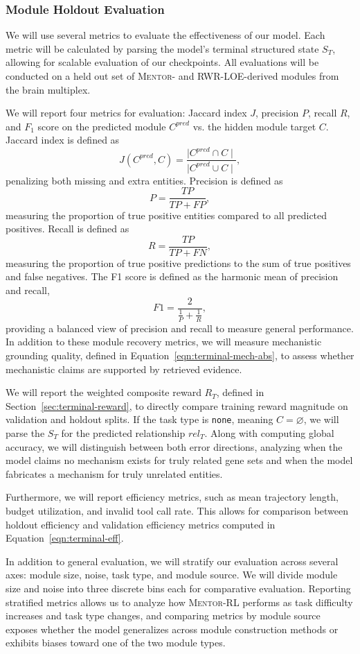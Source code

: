 \documentclass[thesis,letterpaper,12pt]{utthesis}
\begin{document}
\subsubsection{Module Holdout Evaluation}
We will use several metrics to evaluate the effectiveness of our model. Each metric will be calculated by parsing the model's terminal structured state $S_T$, allowing for scalable evaluation of our checkpoints. All evaluations will be conducted on a held out set of \textsc{Mentor}- and RWR-LOE-derived modules from the brain multiplex.

We will report four metrics for evaluation: Jaccard index $J$, precision $P$, recall $R$, and $F_1$ score on the predicted module $C^{pred}$ vs. the hidden module target $C$. Jaccard index is defined as 
\[
    J(C^{pred}, C) = \frac{\mid C^{pred} \cap C \mid}{\mid C^{pred} \cup C \mid},
\]
penalizing both missing and extra entities. Precision is defined as
\[
    P = \frac{TP}{TP + FP},
\]
measuring the proportion of true positive entities compared to all predicted positives. Recall is defined as
\[
    R = \frac{TP}{TP + FN},
\]
measuring the proportion of true positive predictions to the sum of true positives and false negatives. The F1 score is defined as the harmonic mean of precision and recall,
\[
    F1 = \frac{2}{\frac{1}{P} + \frac{1}{R}},
\]
providing a balanced view of precision and recall to measure general performance. In addition to these module recovery metrics, we will measure mechanistic grounding quality, defined in Equation~\ref{eqn:terminal-mech-abs}, to assess whether mechanistic claims are supported by retrieved evidence.  

We will report the weighted composite reward $R_T$, defined in Section~\ref{sec:terminal-reward}, to directly compare training reward magnitude on validation and holdout splits. If the task type is \texttt{none}, meaning $C = \varnothing$, we will parse the $S_T$ for the predicted relationship $rel_T$. Along with computing global accuracy, we will distinguish between both error directions, analyzing when the model claims no mechanism exists for truly related gene sets and when the model fabricates a mechanism for truly unrelated entities.

Furthermore, we will report efficiency metrics, such as mean trajectory length, budget utilization, and invalid tool call rate. This allows for comparison between holdout efficiency and validation efficiency metrics computed in Equation~\ref{eqn:terminal-eff}.

In addition to general evaluation, we will stratify our evaluation across several axes: module size, noise, task type, and module source. We will divide module size and noise into three discrete bins each for comparative evaluation. Reporting stratified metrics allows us to analyze how \textsc{Mentor-RL} performs as task difficulty increases and task type changes, and comparing metrics by module source exposes whether the model generalizes across module construction methods or exhibits biases toward one of the two module types.
\end{document}
